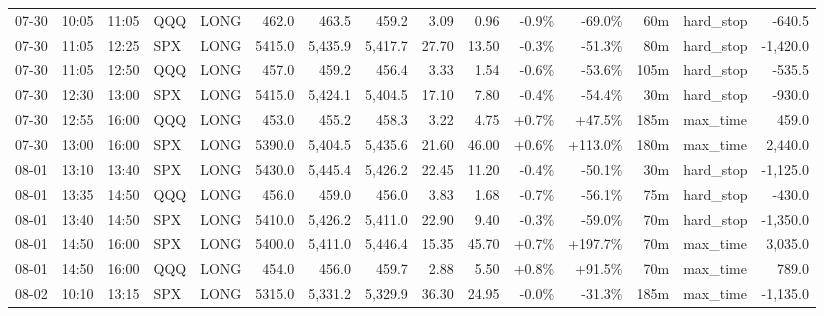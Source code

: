\documentclass[11pt,a4paper,twoside]{article}
\begin{document}
\begin{landscape}
\begin{center}
\begin{longtable}{>{\color{txtmain}}l l l l l r r r r r r r r >{\color{txtmain}}l r}
07-30 & 10:05 & 11:05 & QQQ & LONG & 462.0 & 463.5 & 459.2 & 3.09 & 0.96 & \textcolor{lossred}{-0.9\%} & \textcolor{lossred}{-69.0\%} & 60m & hard\_stop & \textcolor{lossred}{-640.5} \\
07-30 & 11:05 & 12:25 & SPX & LONG & 5415.0 & 5,435.9 & 5,417.7 & 27.70 & 13.50 & \textcolor{lossred}{-0.3\%} & \textcolor{lossred}{-51.3\%} & 80m & hard\_stop & \textcolor{lossred}{-1,420.0} \\
07-30 & 11:05 & 12:50 & QQQ & LONG & 457.0 & 459.2 & 456.4 & 3.33 & 1.54 & \textcolor{lossred}{-0.6\%} & \textcolor{lossred}{-53.6\%} & 105m & hard\_stop & \textcolor{lossred}{-535.5} \\
07-30 & 12:30 & 13:00 & SPX & LONG & 5415.0 & 5,424.1 & 5,404.5 & 17.10 & 7.80 & \textcolor{lossred}{-0.4\%} & \textcolor{lossred}{-54.4\%} & 30m & hard\_stop & \textcolor{lossred}{-930.0} \\
07-30 & 12:55 & 16:00 & QQQ & LONG & 453.0 & 455.2 & 458.3 & 3.22 & 4.75 & \textcolor{wingreen}{+0.7\%} & \textcolor{wingreen}{+47.5\%} & 185m & max\_time & \textcolor{wingreen}{459.0} \\
07-30 & 13:00 & 16:00 & SPX & LONG & 5390.0 & 5,404.5 & 5,435.6 & 21.60 & 46.00 & \textcolor{wingreen}{+0.6\%} & \textcolor{wingreen}{+113.0\%} & 180m & max\_time & \textcolor{wingreen}{2,440.0} \\
08-01 & 13:10 & 13:40 & SPX & LONG & 5430.0 & 5,445.4 & 5,426.2 & 22.45 & 11.20 & \textcolor{lossred}{-0.4\%} & \textcolor{lossred}{-50.1\%} & 30m & hard\_stop & \textcolor{lossred}{-1,125.0} \\
08-01 & 13:35 & 14:50 & QQQ & LONG & 456.0 & 459.0 & 456.0 & 3.83 & 1.68 & \textcolor{lossred}{-0.7\%} & \textcolor{lossred}{-56.1\%} & 75m & hard\_stop & \textcolor{lossred}{-430.0} \\
08-01 & 13:40 & 14:50 & SPX & LONG & 5410.0 & 5,426.2 & 5,411.0 & 22.90 & 9.40 & \textcolor{lossred}{-0.3\%} & \textcolor{lossred}{-59.0\%} & 70m & hard\_stop & \textcolor{lossred}{-1,350.0} \\
08-01 & 14:50 & 16:00 & SPX & LONG & 5400.0 & 5,411.0 & 5,446.4 & 15.35 & 45.70 & \textcolor{wingreen}{+0.7\%} & \textcolor{wingreen}{+197.7\%} & 70m & max\_time & \textcolor{wingreen}{3,035.0} \\
08-01 & 14:50 & 16:00 & QQQ & LONG & 454.0 & 456.0 & 459.7 & 2.88 & 5.50 & \textcolor{wingreen}{+0.8\%} & \textcolor{wingreen}{+91.5\%} & 70m & max\_time & \textcolor{wingreen}{789.0} \\
08-02 & 10:10 & 13:15 & SPX & LONG & 5315.0 & 5,331.2 & 5,329.9 & 36.30 & 24.95 & \textcolor{lossred}{-0.0\%} & \textcolor{lossred}{-31.3\%} & 185m & max\_time & \textcolor{lossred}{-1,135.0} \\

\end{longtable}
\end{center}
\end{landscape}
\end{document}
